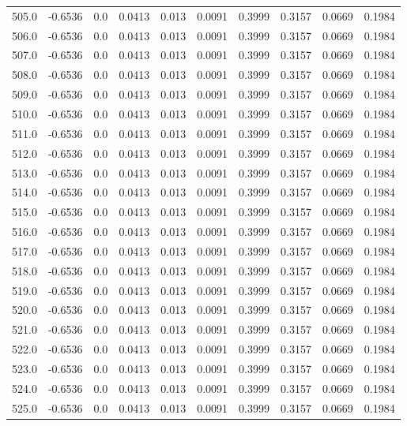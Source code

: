 \begin{longtable}{lrrrrrrrrr}
505.0 & -0.6536 & 0.0 & 0.0413 & 0.013 & 0.0091 & 0.3999 & 0.3157 & 0.0669 & 0.1984 \\
506.0 & -0.6536 & 0.0 & 0.0413 & 0.013 & 0.0091 & 0.3999 & 0.3157 & 0.0669 & 0.1984 \\
507.0 & -0.6536 & 0.0 & 0.0413 & 0.013 & 0.0091 & 0.3999 & 0.3157 & 0.0669 & 0.1984 \\
508.0 & -0.6536 & 0.0 & 0.0413 & 0.013 & 0.0091 & 0.3999 & 0.3157 & 0.0669 & 0.1984 \\
509.0 & -0.6536 & 0.0 & 0.0413 & 0.013 & 0.0091 & 0.3999 & 0.3157 & 0.0669 & 0.1984 \\
510.0 & -0.6536 & 0.0 & 0.0413 & 0.013 & 0.0091 & 0.3999 & 0.3157 & 0.0669 & 0.1984 \\
511.0 & -0.6536 & 0.0 & 0.0413 & 0.013 & 0.0091 & 0.3999 & 0.3157 & 0.0669 & 0.1984 \\
512.0 & -0.6536 & 0.0 & 0.0413 & 0.013 & 0.0091 & 0.3999 & 0.3157 & 0.0669 & 0.1984 \\
513.0 & -0.6536 & 0.0 & 0.0413 & 0.013 & 0.0091 & 0.3999 & 0.3157 & 0.0669 & 0.1984 \\
514.0 & -0.6536 & 0.0 & 0.0413 & 0.013 & 0.0091 & 0.3999 & 0.3157 & 0.0669 & 0.1984 \\
515.0 & -0.6536 & 0.0 & 0.0413 & 0.013 & 0.0091 & 0.3999 & 0.3157 & 0.0669 & 0.1984 \\
516.0 & -0.6536 & 0.0 & 0.0413 & 0.013 & 0.0091 & 0.3999 & 0.3157 & 0.0669 & 0.1984 \\
517.0 & -0.6536 & 0.0 & 0.0413 & 0.013 & 0.0091 & 0.3999 & 0.3157 & 0.0669 & 0.1984 \\
518.0 & -0.6536 & 0.0 & 0.0413 & 0.013 & 0.0091 & 0.3999 & 0.3157 & 0.0669 & 0.1984 \\
519.0 & -0.6536 & 0.0 & 0.0413 & 0.013 & 0.0091 & 0.3999 & 0.3157 & 0.0669 & 0.1984 \\
520.0 & -0.6536 & 0.0 & 0.0413 & 0.013 & 0.0091 & 0.3999 & 0.3157 & 0.0669 & 0.1984 \\
521.0 & -0.6536 & 0.0 & 0.0413 & 0.013 & 0.0091 & 0.3999 & 0.3157 & 0.0669 & 0.1984 \\
522.0 & -0.6536 & 0.0 & 0.0413 & 0.013 & 0.0091 & 0.3999 & 0.3157 & 0.0669 & 0.1984 \\
523.0 & -0.6536 & 0.0 & 0.0413 & 0.013 & 0.0091 & 0.3999 & 0.3157 & 0.0669 & 0.1984 \\
524.0 & -0.6536 & 0.0 & 0.0413 & 0.013 & 0.0091 & 0.3999 & 0.3157 & 0.0669 & 0.1984 \\
525.0 & -0.6536 & 0.0 & 0.0413 & 0.013 & 0.0091 & 0.3999 & 0.3157 & 0.0669 & 0.1984 \\

\end{longtable}
